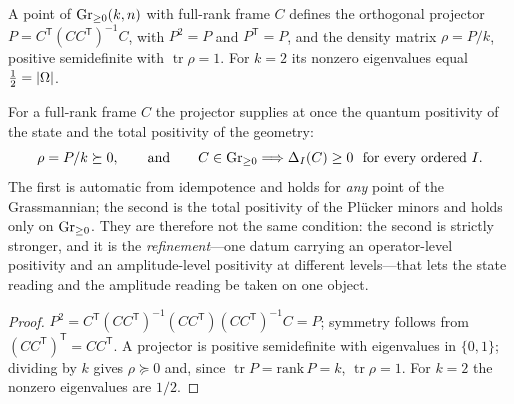 \begin{proposition}\label{prop:rho}
A point of $\mathrm{Gr}_{\ge0}(k,n)$ with full-rank frame $C$ defines the orthogonal projector
$P=C^{\mathsf T}(CC^{\mathsf T})^{-1}C$, with $P^2=P$ and $P^{\mathsf T}=P$, and the density
matrix $\rho=P/k$, positive semidefinite with $\operatorname{tr}\rho=1$. For $k=2$ its nonzero
eigenvalues equal $\tfrac12=\lvert\Omega\rvert$.


\end{proposition}

\begin{proposition}\label{prop:two-pos}
For a full-rank frame $C$ the projector supplies at once the quantum positivity of the state and the
total positivity of the geometry:
\begin{equation}\label{eq:two-pos}
  \rho=P/k\succeq0,\qquad\text{and}\qquad C\in\mathrm{Gr}_{\ge0} \Longrightarrow \Delta_I(C)\ge0
  \ \text{ for every ordered } I .
\end{equation}
The first is automatic from idempotence and holds for \emph{any} point of the Grassmannian; the
second is the total positivity of the Pl\"ucker minors and holds only on $\mathrm{Gr}_{\ge0}$. They are therefore
not the same condition: the second is strictly stronger, and it is the \emph{refinement}---one datum
carrying an operator-level positivity and an amplitude-level positivity at different levels---that
lets the state reading and the amplitude reading be taken on one object.


\end{proposition}
\begin{proof}
$P^2=C^{\mathsf T}(CC^{\mathsf T})^{-1}(CC^{\mathsf T})(CC^{\mathsf T})^{-1}C=P$; symmetry follows
from $(CC^{\mathsf T})^{\mathsf T}=CC^{\mathsf T}$. A projector is positive semidefinite with
eigenvalues in $\{0,1\}$; dividing by $k$ gives $\rho\succeq0$ and, since $\operatorname{tr}P=\mathrm{rank}\,P=k$,
$\operatorname{tr}\rho=1$. For $k=2$ the nonzero eigenvalues are $1/2$.
\end{proof}

